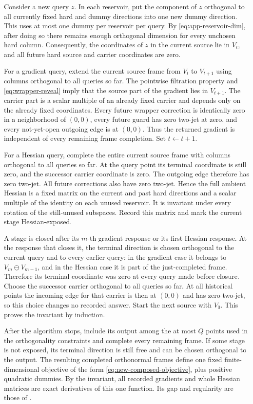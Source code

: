 \documentclass[11pt]{article}
\theoremstyle{remark}
\theoremstyle{remark}
\begin{document}
Consider a new query $z$.  In each reservoir, put the component of $z$
orthogonal to all currently fixed hard and dummy directions into one new
dummy direction.  This uses at most one dummy per reservoir per query.
By \eqref{eq:app-reservoir-dim}, after doing so there remains enough
orthogonal dimension for every unchosen hard column.  Consequently, the
coordinates of $z$ in the current source lie in $V_t$, and all future
hard source and carrier coordinates are zero.

For a gradient query, extend the current source frame from $V_t$ to
$V_{t+1}$ using columns orthogonal to all queries so far.  The pointwise
filtration property and \eqref{eq:wrapper-reveal} imply that the source
part of the gradient lies in $V_{t+1}$.  The carrier part is a scalar
multiple of an already fixed carrier and depends only on the already
fixed coordinates.  Every future wrapper correction is identically zero
in a neighborhood of $(0,0)$, every future guard has zero two-jet at zero,
and every not-yet-open outgoing edge is at $(0,0)$.  Thus the returned
gradient is independent of every remaining frame completion.  Set
$t\leftarrow t+1$.

For a Hessian query, complete the entire current source frame with columns
orthogonal to all queries so far.  At the query point its terminal
coordinate is still zero, and the successor carrier coordinate is zero.
The outgoing edge therefore has zero two-jet.  All future corrections
also have zero two-jet.  Hence the full ambient Hessian is a fixed matrix
on the current and past hard directions and a scalar multiple of the
identity on each unused reservoir.  It is invariant under every rotation
of the still-unused subspaces.  Record this matrix and mark the current
stage Hessian-exposed.

A stage is closed after its $m$-th gradient response or its first Hessian
response.  At the response that closes it, the terminal direction is
chosen orthogonal to the current query and to every earlier query: in the
gradient case it belongs to $V_m\ominus V_{m-1}$, and in the Hessian case
it is part of the just-completed frame.  Therefore its terminal coordinate
was zero at every query made before closure.  Choose the successor carrier
orthogonal to all queries so far.  At all historical points the incoming
edge for that carrier is then at $(0,0)$ and has zero two-jet, so this
choice changes no recorded answer.  Start the next source with $V_0$.
This proves the invariant by induction.

After the algorithm stops, include its output among the at most $Q$
points used in the orthogonality constraints and complete every remaining
frame.  If some stage is not exposed, its terminal direction is still
free and can be chosen orthogonal to the output.  The resulting completed
orthonormal frames define one fixed finite-dimensional objective of the
form \eqref{eq:new-composed-objective}, plus positive quadratic dummies.
By the invariant, all recorded gradients and whole Hessian matrices are
exact derivatives of this one function.  Its gap and regularity are those
of .
\end{document}

